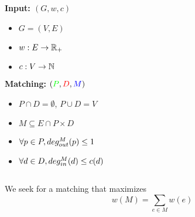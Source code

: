 \begin{frame}
\begin{columns}

\begin{column}{.45\textwidth}
\textbf{Input: $(G, w, c)$}
\begin{itemize}
\item $G=(V,E)$
\item $w:E \to \mathbb{R}_+$
\item $c:V \to \mathbb{N}$
\end{itemize}

\textbf{Matching:} $({\color{green} P}, {\color{red} D}, {\color{blue} M})$

\begin{itemize}
\item $P \cap D = \emptyset$, $P \cup D = V$
\item $M \subseteq E \cap P \times D$
\item $\forall p \in P, deg^M_{out}(p) \leq 1$
\item $\forall d \in D, deg^M_{in}(d) \leq c(d)$
\end{itemize}
\end{column}

\begin{column}{.55\textwidth}
\centering

\end{column}
\end{columns}

\vfill
We seek for a matching that maximizes
$$w(M) = \sum_{e \in M}{w(e)}$$

\end{frame}